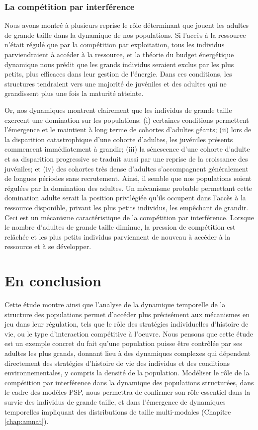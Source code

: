 \subsubsection{La compétition par interférence}

Nous avons montré à plusieurs reprise le rôle déterminant que jouent les adultes
de grande taille dans la dynamique de nos populations. Si l'accès à la ressource
n'était régulé que par la compétition par exploitation, tous les individus
parviendraient à accéder à la ressource, et la théorie du budget énergétique
dynamique nous prédit que les grands individus seraient exclus par les plus
petits, plus efficaces dans leur gestion de l'énergie. Dans ces conditions, les
structures tendraient vers une majorité de juvéniles et des adultes qui ne
grandissent plus une fois la maturité atteinte. 

Or, nos dynamiques montrent clairement que les individus de grande taille
exercent une domination sur les populations: (i) certaines conditions permettent
l'émergence et le maintient à long terme de cohortes d'adultes géants; (ii) lors
de la disparition catastrophique d'une cohorte d'adultes, les juvéniles présents
commencent immédiatement à grandir; (iii) la sénescence d'une cohorte d'adulte
et sa disparition progressive se traduit aussi par une reprise de la croissance
des juvéniles; et (iv) des cohortes très dense d'adultes s'accompagnent
généralement de longues périodes sans recrutement. Ainsi, il semble que nos
populations soient régulées par la domination des adultes. Un mécanisme probable
permettant cette domination adulte serait la position privilégiée qu'ils
occupent dans l'accès à la ressource disponible, privant les plus petits
individus, les empêchant de grandir. Ceci est un mécanisme caractéristique de la
compétition par interférence. Lorsque le nombre d'adultes de grande taille
diminue, la pression de compétition est relâchée et les plus petits individus
parviennent de nouveau à accéder à la ressource et à se développer.


\section{En conclusion}

Cette étude montre ainsi que l'analyse de la dynamique temporelle de la
structure des populations permet d'accéder plus précisément aux mécanismes en
jeu dans leur régulation, tels que le rôle des stratégies individuelles
d'histoire de vie, ou le type d'interaction compétitive à l'oeuvre. Nous pensons
que cette étude est un exemple concret du fait qu'une population puisse être
contrôlée par ses adultes les plus grands, donnant lieu à des dynamiques
complexes qui dépendent directement des stratégies d'histoire de vie des
individus et des conditions environnementales, y compris la densité de
la population.
Modéliser le rôle de la compétition par interférence dans la dynamique des populations structurées, dans le cadre des modèles PSP, nous
permettra de confirmer son rôle essentiel dans la survie des
individus de grande taille, et dans l'émergence de dynamiques temporelles
impliquant des distributions de taille multi-modales (Chapitre
\ref{chap:amnat}).

